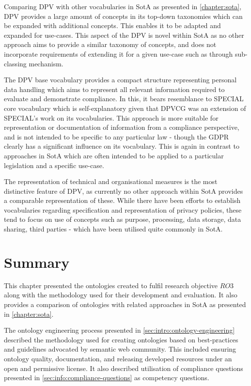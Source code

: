 Comparing DPV with other vocabularies in SotA as presented in \autoref{chapter:sota}, DPV provides a large amount of concepts in its top-down taxonomies which can be expanded with additional concepts. This enables it to be adapted and expanded for use-cases.
This aspect of the DPV is novel within SotA as no other approach aims to provide a similar taxonomy of concepts, and does not incorporate requirements of extending it for a given use-case such as through sub-classing mechanism.

The DPV base vocabulary provides a compact structure representing personal data handling which aims to represent all relevant information required to evaluate and demonstrate compliance.
In this, it bears resemblance to SPECIAL core vocabulary \cite{bonatti_special_2018-2} which is self-explanatory given that DPVCG was an extension of SPECIAL's work on its vocabularies.
This approach is more suitable for representation or documentation of information from a compliance perspective, and is not intended to be specific to any particular law - though the GDPR clearly has a significant influence on its vocabulary.
This is again in contrast to approaches in SotA which are often intended to be applied to a particular legislation and a specific use-case.

The representation of technical and organisational measures is the most distinctive feature of DPV, as currently no other approach within SotA provides a comparable representation of these.
While there have been efforts to establish vocabularies regarding specification and representation of privacy policies, these tend to focus on use of concepts such as purpose, processing, data storage, data sharing, third parties - which have been utilised quite commonly in SotA.

\section*{Summary}
This chapter presented the ontologies created to fulfil research objective $RO3$ along with the methodology used for their development and evaluation. It also provides a comparison of ontologies with related approaches in SotA as presented in \autoref{chapter:sota}.

The ontology engineering process presented in \autoref{sec:intro:ontology-engineering} described the methodology used for creating ontologies based on best-practices and guidelines advocated by semantic web community. This included ensuring ontology quality, documentation, and releasing developed resources under an open and permissive license.
It also described utilisation of compliance questions presented in \autoref{sec:info:compliance-questions} as competency questions.


